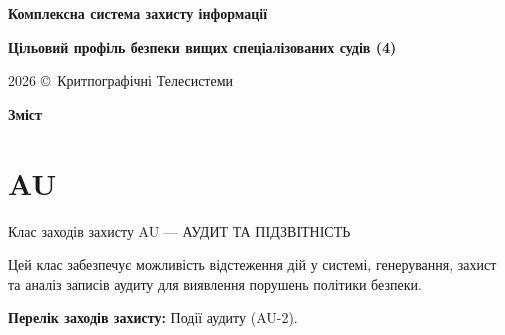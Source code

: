 \documentclass{article}
\newcommand\HUGE[1]{\fontsize{40}{40}\selectfont #1}
\begin{document}
\pagestyle{fancy}

\begin{titlepage}
  \AddToShipoutPictureBG*{\AtPageLowerLeft{\color{nato}\rule{\paperwidth}{\paperheight}}}
  \color{white}\thispagestyle{empty}\vspace*{4cm}\centering
  {\Huge  \textbf{Комплексна система захисту інформації} \par} \vspace{2cm}
  {\HUGE  \textbf{Цільовий профіль безпеки вищих спеціалізованих судів (4)} \par} \vspace{2.5cm}
  \vfill
  {\large 2026 \copyright\ Критпографічні Телесистеми \par}
\end{titlepage}

\newpage

\begin{center}
  {\Huge\color{nato}\bfseries Зміст\par}
\end{center}
\vspace{40pt}
\tableofcontents

\begin{abstract}
Цільовий профіль безпеки (ЦПБ) — індивідуальний для конкретної системи підприємства. Саме на його основі створюється/модернізується КЗЗІ. Включає лише додаткові вимоги (відмінності) відносно Галузевого профілю.
\end{abstract}

\section{AU}
Клас заходів захисту AU --- АУДИТ ТА ПІДЗВІТНІСТЬ

Цей клас забезпечує можливість відстеження дій у системі, генерування, захист та аналіз записів аудиту для виявлення порушень політики безпеки.

\textbf{Перелік заходів захисту:} Події аудиту (AU-2).
\end{document}
